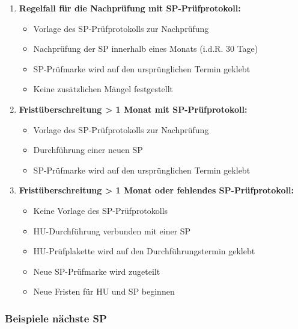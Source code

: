 \documentclass{vorlage-design-main}
\begin{document}
\begin{enumerate}
\def\labelenumi{\arabic{enumi}.}

\item
  \textbf{Regelfall für die Nachprüfung mit SP-Prüfprotokoll:}

  \begin{itemize}
  
  \item
    Vorlage des SP-Prüfprotokolls zur Nachprüfung
  \item
    Nachprüfung der SP innerhalb eines Monats (i.d.R. 30 Tage)
  \item
    SP-Prüfmarke wird auf den ursprünglichen Termin geklebt
  \item
    Keine zusätzlichen Mängel festgestellt
  \end{itemize}
\item
  \textbf{Fristüberschreitung \textgreater{} 1 Monat mit
  SP-Prüfprotokoll:}

  \begin{itemize}
  
  \item
    Vorlage des SP-Prüfprotokolls zur Nachprüfung
  \item
    Durchführung einer neuen SP
  \item
    SP-Prüfmarke wird auf den ursprünglichen Termin geklebt
  \end{itemize}
\item
  \textbf{Fristüberschreitung \textgreater{} 1 Monat oder fehlendes
  SP-Prüfprotokoll:}

  \begin{itemize}
  
  \item
    Keine Vorlage des SP-Prüfprotokolls
  \item
    HU-Durchführung verbunden mit einer SP
  \item
    HU-Prüfplakette wird auf den Durchführungstermin geklebt
  \item
    Neue SP-Prüfmarke wird zugeteilt
  \item
    Neue Fristen für HU und SP beginnen
  \end{itemize}
\end{enumerate}

\subsubsection{Beispiele nächste SP}\label{beispiele-naechste-sp}
\end{document}
